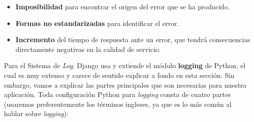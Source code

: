     \begin{itemize}
        \item \textbf{Imposibilidad} para encontrar el origen del error que se ha
        producido.
        \item \textbf{Formas no estandarizadas} para identificar el error.
        \item \textbf{Incremento} del tiempo de respuesta ante un error, que tendrá
        consecuencias directamente negativas en la calidad de servicio.
    \end{itemize}

Para el Sistema de \textit{Log}, Django usa y extiende el módulo \textbf{logging}
\cite{python-logging} de Python, el cual es muy extenso y carece de sentido explicar a
fondo en esta sección. Sin embargo, vamos a explicar las partes principales que son
necesarias para nuestra aplicación. Toda configuración Python para \textit{logging} consta
de cuatro partes (usaremos preferentemente los términos ingleses, ya que es lo más común al
hablar sobre \textit{logging}):


